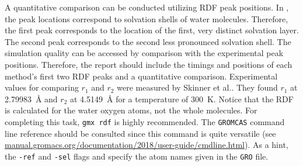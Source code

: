 \documentclass[9pt,tutorial]{livecoms}
\newcommand{\code}[1]{\colorbox{light-gray}{\texttt{#1}}}
\begin{document}
A quantitative comparison can be conducted utilizing RDF peak positions. In , the peak locations correspond to solvation shells of water molecules. Therefore, the first peak corresponds to the location of the first, very distinct solvation layer. The second peak corresponds to the second less pronounced solvation shell. The simulation quality can be accessed by comparison with the experimental peak positions. Therefore, the report should include the timings and positions of each method's first two RDF peaks and a quantitative comparison. Experimental values for comparing $r_1$ and $r_2$ were measured by Skinner et al.\cite{Skinner2014}. They found $r_1$ at \SI{2.79983}{\angstrom} and $r_2$ at \SI{4.5149}{\angstrom} for a temperature of \SI{300}{K}. Notice that the RDF is calculated for the water oxygen atoms, not the whole molecules. For completing this task, \code{gmx rdf} is highly recommended. The \texttt{GROMCAS} command line reference should be consulted since this command is quite versatile (see \url{manual.gromacs.org/documentation/2018/user-guide/cmdline.html}). As a hint, the \code{-ref} and \code{-sel} flags and specify the atom names given in the \texttt{GRO} file.
\end{document}

